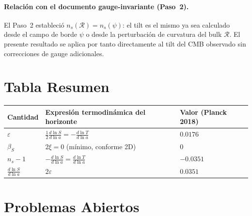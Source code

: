 \documentclass[12pt,a4paper]{article}
\begin{document}
\paragraph{Relación con el documento gauge-invariante (Paso~2).}
El Paso~2 estableció $n_s(\mathcal{R}) = n_s(\psi)$: el tilt es el mismo ya sea calculado desde el campo de borde $\psi$ o desde la perturbación de curvatura del bulk $\mathcal{R}$. El presente resultado se aplica por tanto directamente al tilt del CMB observado sin correcciones de gauge adicionales.

\section{Tabla Resumen}

\begin{table}[h]
\centering
\begin{tabular}{lll}
\toprule
Cantidad & Expresión termodinámica del horizonte & Valor (Planck 2018) \\
\midrule
$\varepsilon$ & $\frac{1}{2}\frac{d\ln S}{d\ln a} = -\frac{d\ln T}{d\ln a}$ & $0.0176$ \\
$\beta_S$ & $2\xi = 0$ (mínimo, conforme 2D) & $0$ \\
$n_s - 1$ & $-\frac{d\ln S}{d\ln a} = \frac{d\ln T}{d\ln a}$ & $-0.0351$ \\
$\frac{d\ln S}{d\ln a}$ & $2\varepsilon$ & $0.0351$ \\
\bottomrule
\end{tabular}
\end{table}

\section{Problemas Abiertos}
\end{document}
